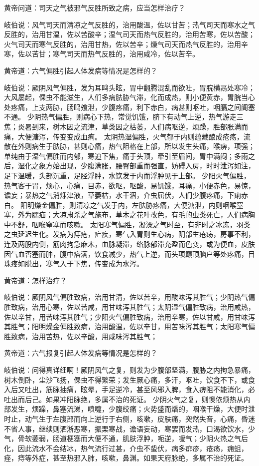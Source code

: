 \documentclass[a4paper,12pt,UTF8,twoside]{ctexbook}
\begin{document}
黄帝问道：司天之气被邪气反胜所致之病，应当怎样治疗？

岐伯说：风气司天而清凉之气反胜的，治用酸温，佐以甘苦；热气司天而寒水之气反胜的，治用甘温，佐以苦酸辛；湿气司天而热气反胜的，治用苦寒，佐以苦酸；火气司天而寒气反胜的，治用甘热，佐以苦辛；燥气司天而热气反胜的，治用辛寒，佐以苦甘；寒气司天而热气反胜的，治用咸冷，佐以苦辛。

黄帝道：六气偏胜引起人体发病等情况是怎样的？

岐伯说：厥阴风气偏胜，发为耳鸣头眩，胃中翻腾混乱而欲吐，胃脘横鬲处寒冷；大风屡起，倮虫不能滋生，人们多病胠胁气滞，化而成热，则小便黄赤，胃脘当心处疼痛，上支两胁，肠鸣飧泄，少腹疼痛，利下赤白，病甚则呕吐，咽膈之间阁塞不通。
少阴热气偏胜，则病心下热，常觉饥饿，脐下有动气上逆，热气游走三焦；炎暑到来，树木因之流津，草类因之枯萎，人们病呕逆，烦躁，胜部胀满而痛，大便溏泻，传变变成血痢。
太阴热湿偏胜，火气郁于内则蕴藏酿成疮疡，流散在外则病生于胠胁，甚则心痛，热气阻格在上部，所以发生头痛，喉痹，项强；单纯由于湿气偏胜而内郁，寒迫下焦，痛于头顶，牵引至眉间，胃中满闷；多雨之后，湿化之象方始出现，少腹满胀，腰臀部重而强直，妨碍入房，时时泄泻如注，足下温暖，头部沉重，足胫浮肿，水饮发于内而浮肿见于上部。
少阳火气偏胜，热气客于胃，烦心，心痛，目赤，欲呕，呕酸，易饥饿，耳痛，小便赤色，易惊，谵妄；暴热之气消烁津液，草萎枯，水干涸，介虫屈伏，人们少腹疼痛，下痢赤白。
阳明燥金偏胜，则清凉之气发于内，左胠胁疼痛，大便溏泄，内则咽喉窒塞，外为臑疝；大凉肃杀之气施布，草木之花叶改色，有毛的虫类死亡，人们病胸中不舒，咽喉窒塞而咳嗽。
太阳寒气偏胜，凝潥之气时至，有非时之冰冻，羽类之虫延迟生化。发病为痔疮，疟疾，寒气入胃则生心病，阴部生疮疡，房事不利，连及两股内侧，筋肉拘急麻木，血脉凝滞，络脉郁滞充盈而色变，或为便血，皮肤因气血否塞而肿，腹中痞满，饮食减少，热气上逆，而头项巅顶脑户等处疼痛，目珠疼如脱出，寒气入于下焦，传变成为水泻。

黄帝道：怎样治疗？

岐伯说：厥阴风气偏胜致病，治用甘清，佐以苦辛，用酸味泻其胜气；少阴热气偏胜致病，治用心寒，佐以苦咸，用甘味泻其胜气；太阴湿气偏胜致病，治用咸热，佐以辛甘，用苦味泻其胜气；少阳火气偏胜致病，治用辛寒，佐以甘咸，用甘味泻其胜气；阳明燥金偏胜致病，治用酸温，佐以辛甘，用苦味泻其胜气；太阳寒气偏胜致病，治用苦热，佐以辛酸，用咸味泻其胜气；

黄帝道：六气报复引起人体发病等情况是怎样的？

岐伯说：问得真详细啊！厥阴风气之复，则发为少腹部坚满，腹胁之内拘急暴痛，树木倒卧，尘沙飞扬，倮虫不得繁荣；发生厥心痛，多汗，呕吐，饮食不下，或食入后又吐出，筋脉抽痛，眩晕，手足逆冷，甚至风邪入脾，食入痹阻不能消化，必吐出而后己。如果冲阳脉绝，多属不治的死证。
少阴火气之复，则懊侬烦热从内部发生，烦躁，鼻塞流涕，喷嚏，少腹绞痛；火势盛而燔的，咽喉干燥，大便时泄时止，动气生于左腹部而向上逆行于右侧，咳嗽，皮肤痛，突然失音，心痛，昏迷不省人事，继续则洒淅恶寒，振栗寒战，谵语妄动，寒罢而发热，口渴欲饮水，少气，骨软萎弱，肠道梗塞而大便不通，肌肤浮肿，呃逆，嗳气；少阴火热之气后化，因此流水不会结冰，热气流行过甚，介虫不蛰伏，病多痱疹，疮疡，痈蛆，痤，痔等外症，甚至热邪入肺，咳嗽，鼻渊。如果天府脉绝，多属不治的死证。
\end{document}
